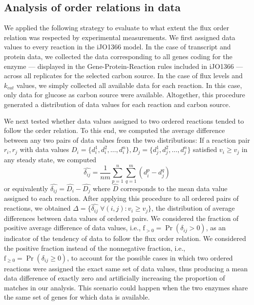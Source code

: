 \documentclass[12pt]{article}
\begin{document}
\subsection{Analysis of order relations in data}
\label{sec:dataAnalysis}
We applied the following strategy to evaluate to what extent the flux order relation was respected by experimental measurements. We first assigned data values to every reaction in the iJO1366 model. In the case of transcript and protein data, we collected the data corresponding to all genes coding for the enzyme --- displayed in the Gene-Protein-Reaction rules included in iJO1366 --- across all replicates for the selected carbon source. In the case of flux levels and $k_{cat}$ values, we simply collected all available data for each reaction. In this case, only data for glucose as carbon source were available. Altogether, this procedure generated a distribution of data values for each reaction and carbon source.

We next tested whether data values assigned to two ordered reactions tended to follow the order relation. To this end, we computed the average difference between any two pairs of data values from the two distributions: If a reaction pair $r_i, r_j$ with data values $D_i = \{d^1_i, d^2_i, \dots, d^n_i\}, D_j = \{d^1_j, d^2_j, \dots, d^n_j\}$ satisfied $v_i \geq v_j$ in any steady state, we computed $$\hat{\delta_{ij}} = \frac{1}{nm} \sum_{p=1}^{n} \sum_{q=1}^{m} (d^p_i - d^q_j)$$ or equivalently $\hat{\delta_{ij}} = \hat{D_i} - \hat{D_j}$ where $\hat{D}$ corresponds to the mean data value assigned to each reaction. After applying this procedure to all ordered pairs of reactions, we obtained $\Delta = \{\hat{\delta_{ij}} \; \forall (i,j) : v_i \geq v_j\}$, the distribution of average differences between data values of ordered pairs. We considered the fraction of positive average difference of data values, i.e., $\mathrm{f}_{>0} = \Pr(\delta_{ij} > 0)$, as an indicator of the tendency of data to follow the flux order relation. We considered the positive fraction instead of the nonnegative fraction, i.e., $\mathrm{f}_{\geq0} = \Pr(\delta_{ij} \geq 0)$, to account for the possible cases in which two ordered reactions were assigned the exact same set of data values, thus producing a mean data difference of exactly zero and artificially increasing the proportion of matches in our analysis. This scenario could happen when the two enzymes share the same set of genes for which data is available.
\end{document}
